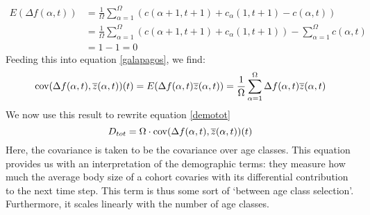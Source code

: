 \begin{equation}
\begin{aligned}
E(\Delta f(\alpha,t)) &= \frac{1}{\Omega} \sum_{\alpha=1}^\Omega (c(\alpha+1,t+1) + c_\alpha(1,t+1) - c(\alpha,t)) \\ &
= \frac{1}{\Omega} \sum_{\alpha=1}^\Omega (c(\alpha+1,t+1) + c_\alpha(1,t+1)) - \sum_{\alpha=1}^\Omega c(\alpha,t) \\ &
= 1 - 1 = 0
\end{aligned}
\end{equation}
Feeding this into equation \ref{galapagos}, we find:
\begin{equation}
\mathrm{cov}(\Delta f(\alpha,t),\overline{z}(\alpha,t))(t) = E(\Delta f(\alpha,t) \overline{z}(\alpha,t)) = \frac{1}{\Omega} \sum_{\alpha=1}^\Omega \Delta f(\alpha,t) \overline{z}(\alpha,t)
\end{equation}
We now use this result to rewrite equation \ref{demotot}
\begin{equation} \label{app:ape:eq:dtot}
D_{tot} = \Omega \cdot \mathrm{cov}(\Delta f(\alpha,t),\overline{z}(\alpha,t))(t)
\end{equation}
Here, the covariance is taken to be the covariance over age classes. This equation provides us with an interpretation of the demographic terms: they measure how much the average body size of a cohort covaries with its differential contribution to the next time step. This term is thus some sort of `between age class selection'. Furthermore, it scales linearly with the number of age classes.

